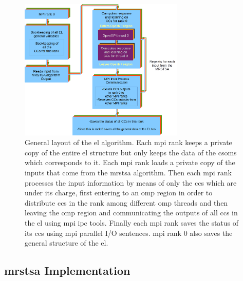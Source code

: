 \documentclass[10pt,journal,compsoc]{IEEEtran}
\begin{document}
\begin{figure}[ht]
    \centering
    \includegraphics[width=0.7\textwidth]{EL_ALG.png}
    \caption{General layout of the \gls{el} algorithm. Each \gls{mpi} rank keeps a private copy of the entire \gls{el} structure but only keeps the data of the \glspl{csom} which corresponds to it. Each \gls{mpi} rank loads a private copy of the inputs that come from the \gls{mrstsa} algorithm. Then each \gls{mpi} rank processes the input information by means of only the \glspl{cc} which are under its charge, first entering to an \gls{omp} region in order to distribute \glspl{cc} in the rank among different \gls{omp} threads and then leaving the \gls{omp} region and communicating the outputs of all \glspl{cc} in the \gls{el} using \gls{mpi} \gls{ipc} tools. Finally each \gls{mpi} rank saves the status of its \glspl{cc} using \gls{mpi} parallel I/O sentences. \gls{mpi} rank 0 also saves the general structure of the \gls{el}.} 
    \label{fig:EL_ALG}
\end{figure}














\subsection{\gls{mrstsa} Implementation}
\end{document}
